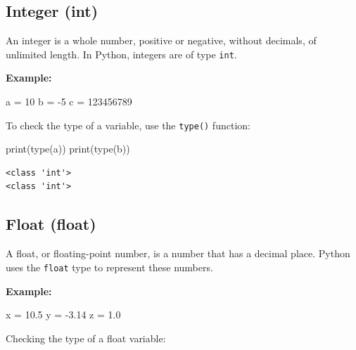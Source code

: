 \documentclass[
  letterpaper,
  DIV=11,
  numbers=noendperiod]{scrreprt}
\newenvironment{Shaded}{\begin{snugshade}}{\end{snugshade}}
\newcommand{\BuiltInTok}[1]{\textcolor[rgb]{0.00,0.23,0.31}{#1}}
\newcommand{\DecValTok}[1]{\textcolor[rgb]{0.68,0.00,0.00}{#1}}
\newcommand{\FloatTok}[1]{\textcolor[rgb]{0.68,0.00,0.00}{#1}}
\newcommand{\NormalTok}[1]{\textcolor[rgb]{0.00,0.23,0.31}{#1}}
\newcommand{\OperatorTok}[1]{\textcolor[rgb]{0.37,0.37,0.37}{#1}}
\begin{document}
\hypertarget{integer-int}{%
\subsection{Integer (int)}\label{integer-int}}

An integer is a whole number, positive or negative, without decimals, of
unlimited length. In Python, integers are of type \texttt{int}.

\textbf{Example:}

\begin{Shaded}
\begin{Highlighting}[]
\NormalTok{a }\OperatorTok{=} \DecValTok{10}
\NormalTok{b }\OperatorTok{=} \OperatorTok{{-}}\DecValTok{5}
\NormalTok{c }\OperatorTok{=} \DecValTok{123456789}
\end{Highlighting}
\end{Shaded}

To check the type of a variable, use the \texttt{type()} function:

\begin{Shaded}
\begin{Highlighting}[]
\BuiltInTok{print}\NormalTok{(}\BuiltInTok{type}\NormalTok{(a))  }
\BuiltInTok{print}\NormalTok{(}\BuiltInTok{type}\NormalTok{(b))}
\end{Highlighting}
\end{Shaded}

\begin{verbatim}
<class 'int'>
<class 'int'>
\end{verbatim}

\hypertarget{float-float}{%
\subsection{Float (float)}\label{float-float}}

A float, or floating-point number, is a number that has a decimal place.
Python uses the \texttt{float} type to represent these numbers.

\textbf{Example:}

\begin{Shaded}
\begin{Highlighting}[]
\NormalTok{x }\OperatorTok{=} \FloatTok{10.5}
\NormalTok{y }\OperatorTok{=} \OperatorTok{{-}}\FloatTok{3.14}
\NormalTok{z }\OperatorTok{=} \FloatTok{1.0}
\end{Highlighting}
\end{Shaded}

Checking the type of a float variable:
\end{document}
